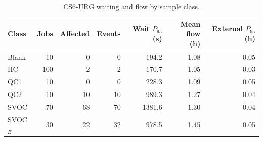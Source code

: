 \begin{table}[tbp]
\caption{CS6-URG waiting and flow by sample class.\label{tab:wait-classes}}
\centering
\footnotesize
\setlength{\tabcolsep}{3pt}
\begin{tabular*}{\textwidth}{@{\extracolsep{\fill}}lrrrrrr@{}}
\toprule
Class & Jobs & Affected & Events & \shortstack{Wait\\$P_{95}$ (s)} & \shortstack{Mean flow\\(h)} & \shortstack{External\\$P_{95}$ (h)}\\
\midrule
Blank & 10 & 0 & 0 & 194.2 & 1.08 & 0.05\\
HC & 100 & 2 & 2 & 170.7 & 1.05 & 0.03\\
QC1 & 10 & 0 & 0 & 228.3 & 1.09 & 0.05\\
QC2 & 10 & 10 & 10 & 989.3 & 1.27 & 0.04\\
SVOC & 70 & 68 & 70 & 1381.6 & 1.30 & 0.04\\
SVOC$_E$ & 30 & 22 & 32 & 978.5 & 1.45 & 0.05\\
\bottomrule
\end{tabular*}
\end{table}
